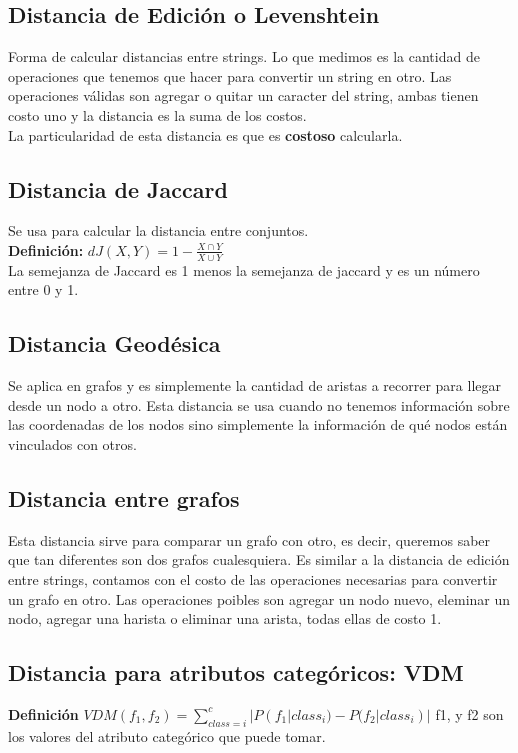 \documentclass[titlepage,a4paper]{article}
\begin{document}
\subsection*{Distancia de Edición o Levenshtein}
Forma de calcular distancias entre strings. Lo que medimos es la cantidad de operaciones que tenemos que hacer para convertir un string en otro. Las operaciones válidas son agregar o quitar un caracter del string, ambas tienen costo uno y la distancia es la suma de los costos.  \\

La particularidad de esta distancia es que es \textbf{costoso} calcularla. 

\subsection*{Distancia de Jaccard}
Se usa para calcular la distancia entre conjuntos. \\

\textbf{Definición:} $dJ(X,Y) = 1 -\frac{X\cap Y}{X\cup Y}$\\

La semejanza de Jaccard es 1 menos la semejanza de jaccard y es un número entre 0 y 1. 

\subsection*{Distancia Geodésica}
Se aplica en grafos y es simplemente la cantidad de aristas a recorrer para llegar desde un nodo a otro. Esta distancia se usa cuando no tenemos información sobre las coordenadas de los nodos sino simplemente la información de qué nodos están vinculados con otros. 

\subsection*{Distancia entre grafos}
Esta distancia sirve para comparar un grafo con otro, es decir, queremos saber que tan diferentes son dos grafos cualesquiera. Es similar a la distancia de edición entre strings, contamos con el costo de las operaciones necesarias para convertir un grafo en otro. Las operaciones poibles son agregar un nodo nuevo, eleminar un nodo, agregar una harista o eliminar una arista, todas ellas de costo 1. 

\subsection*{Distancia para atributos categóricos: VDM}
\textbf{Definición} $VDM(f_1,f_2) = \displaystyle\sum_{class = i} ^c |P(f_1|class_i)-P(f_2|class_i)|$
f1, y f2 son los valores del atributo categórico que puede tomar. 
\end{document}
